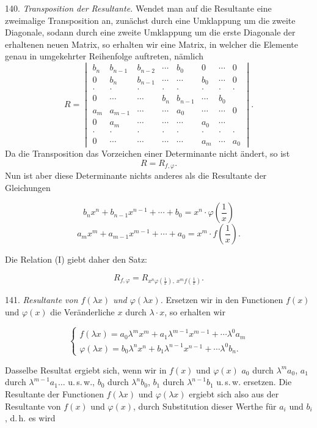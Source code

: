 \documentclass[11pt]{article}
\providecommand{\weberpage}[1]{}
\providecommand{\weq}[2]{\begin{equation}\tag{#1}#2\end{equation}}
\begin{document}
140. \textit{Transposition der Resultante.} Wendet man auf die Resultante eine zweimalige Transposition an, zunächst durch eine Umklappung um die zweite Diagonale, sodann durch eine zweite Umklappung um die erste Diagonale der erhaltenen neuen Matrix, so erhalten wir eine Matrix, in welcher die Elemente genau in umgekehrter Reihenfolge auftreten, nämlich
\[
R =
\begin{vmatrix}
b_n & b_{n-1} & b_{n-2} & \cdots & b_0 & 0 & \cdots & 0 \\
0 & b_n & b_{n-1} & \cdots & \cdots & b_0 & \cdots & 0 \\
\cdot & \cdot & \cdot & \cdot & \cdot & \cdot & \cdot & \cdot \\
0 & \cdots & \cdots & b_n & b_{n-1} & \cdots & b_0 & {} \\
a_m & a_{m-1} & \cdots & \cdots & a_0 & \cdots & \cdots & 0 \\
0 & a_m & \cdots & \cdots & \cdots & a_0 & \cdots & {} \\
\cdot & \cdot & \cdot & \cdot & \cdot & \cdot & \cdot & \cdot \\
0 & \cdots & \cdots & \cdots & \cdots & a_m & \cdots & a_0
\end{vmatrix}.
\]
Da die Transposition das Vorzeichen einer Determinante nicht ändert, so ist
\weq{I}{R = R_{f,\varphi}.}
Nun ist aber diese Determinante nichts anderes als die Resultante der Gleichungen


\weberpage{147}
\[ b_n x^n + b_{n-1}x^{n-1} + \cdots + b_0 = x^n \cdot \varphi\left(\frac{1}{x}\right) \]
\[ a_m x^m + a_{m-1}x^{m-1} + \cdots + a_0 = x^m \cdot f\left(\frac{1}{x}\right). \]

Die Relation (I) giebt daher den Satz:

\[ R_{f,\varphi} = R_{x^n\varphi\left(\frac{1}{x}\right),\ x^mf\left(\frac{1}{x}\right)} . \]

141. \textit{Resultante von $f(\lambda x)$ und $\varphi(\lambda x)$.} Ersetzen wir in den
Functionen $f(x)$ und $\varphi(x)$ die Ver\"anderliche $x$ durch $\lambda \cdot x$, so erhalten
wir

\weq{I}{
\begin{cases}
f(\lambda x) = a_0\lambda^m x^m + a_1\lambda^{m-1}x^{m-1} + \cdots \lambda^0 a_m \\
\varphi(\lambda x) = b_0\lambda^n x^n + b_1\lambda^{n-1}x^{n-1} + \cdots \lambda^0 b_n.
\end{cases}
}

Dasselbe Resultat ergiebt sich, wenn wir in $f(x)$ und $\varphi(x)$ $a_0$ durch
$\lambda^m a_0$, $a_1$ durch $\lambda^{m-1}a_1 \ldots$ u.\,s.\,w., $b_0$ durch
$\lambda^n b_0$, $b_1$ durch $\lambda^{n-1} b_1$ u.\,s.\,w. ersetzen. Die Resultante der
Functionen $f(\lambda x)$ und $\varphi(\lambda x)$ ergiebt sich also aus der Resultante von
$f(x)$ und $\varphi(x)$, durch Substitution dieser Werthe f\"ur $a_i$ und $b_i$, d.\,h. es
wird
\end{document}
